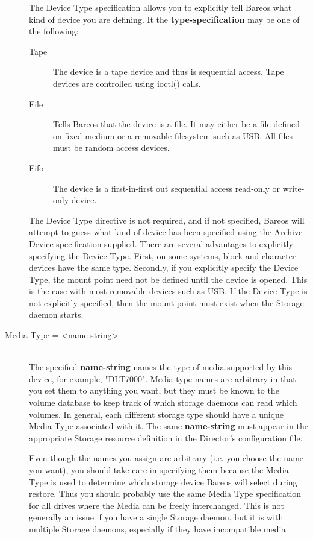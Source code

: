 \begin{description}
The Device Type specification allows you to explicitly tell Bareos
what kind of device you are defining. It the {\bf type-specification}
may be one of the following:
\begin{description}
\item [Tape]
  The device is a tape device and thus is sequential access. Tape devices
  are controlled using ioctl() calls.
\item [File]
  Tells Bareos that the device is a file. It may either be a
  file defined on fixed medium or a removable filesystem such as
  USB.  All files must be random access devices.
\item [Fifo]
  The device is a first-in-first out sequential access read-only
  or write-only device.
\end{description}

The Device Type directive is not required, and if not specified, Bareos
will attempt to guess what kind of device has been specified using the
Archive Device specification supplied. There are several advantages to
explicitly specifying the Device Type. First, on some systems, block and
character devices have the same type.
Secondly, if you explicitly specify the Device Type, the mount point
need not be defined until the device is opened. This is the case with
most removable devices such as USB.
If the Device Type is not explicitly specified, then the mount point
must exist when the Storage daemon starts.



\item [Media Type = {\textless}name-string{\textgreater}] \hfill \\
The specified {\bf name-string} names the type of media supported by this
device, for example, "DLT7000".  Media type names are arbitrary in that you
set them to anything you want, but they must be known to the volume
database to keep track of which storage daemons can read which volumes.  In
general, each different storage type should have a unique Media Type
associated with it.  The same {\bf name-string} must appear in the
appropriate Storage resource definition in the Director's configuration
file.

Even though the names you assign are arbitrary (i.e.  you choose the name
you want), you should take care in specifying them because the Media Type
is used to determine which storage device Bareos will select during
restore.  Thus you should probably use the same Media Type specification
for all drives where the Media can be freely interchanged.  This is not
generally an issue if you have a single Storage daemon, but it is with
multiple Storage daemons, especially if they have incompatible media.


\end{description}
